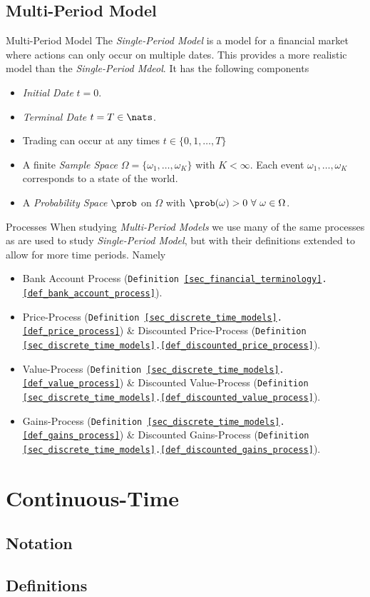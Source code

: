 \documentclass[11pt,a4paper]{article}
\begin{document}
\subsection{Multi-Period Model}

  \begin{definition}{Multi-Period Model}
    The \textit{Single-Period Model} is a model for a financial market where actions can only occur on multiple dates. This provides a more realistic model than the \textit{Single-Period Mdeol}. It has the following components
    \begin{itemize}
      \item \textit{Initial Date} $t=0$.
      \item \textit{Terminal Date} $t=T\in\nats$.
      \item Trading can occur at any times $t\in\{0,1,\dots,T\}$
      \item A finite \textit{Sample Space} $\Omega=\{\omega_1,\dots,\omega_K\}$ with $K<\infty$. Each event $\omega_1,\dots,\omega_K$ corresponds to a state of the world.
      \item A \textit{Probability Space} $\prob$ on $\Omega$ with $\prob(\omega)>0\ \forall\ \omega\in\Omega$.
    \end{itemize}
  \end{definition}

  \begin{remark}{Processes}
    When studying \textit{Multi-Period Models} we use many of the same processes as are used to study \textit{Single-Period Model}, but with their definitions extended to allow for more time periods. Namely
    \begin{itemize}
      \item Bank Account Process (\texttt{Definition \ref{sec_financial_terminology}.\ref{def_bank_account_process}}).
      \item Price-Process (\texttt{Definition \ref{sec_discrete_time_models}.\ref{def_price_process}}) \& Discounted Price-Process (\texttt{Definition \ref{sec_discrete_time_models}.\ref{def_discounted_price_process}}).
      \item Value-Process (\texttt{Definition \ref{sec_discrete_time_models}.\ref{def_value_process}}) \& Discounted Value-Process (\texttt{Definition \ref{sec_discrete_time_models}.\ref{def_discounted_value_process}}).
      \item Gains-Process (\texttt{Definition \ref{sec_discrete_time_models}.\ref{def_gains_process}}) \& Discounted Gains-Process (\texttt{Definition \ref{sec_discrete_time_models}.\ref{def_discounted_gains_process}}).
    \end{itemize}
  \end{remark}

\section{Continuous-Time}\label{sec_continuous_time_models}


\subsection{Notation}

\subsection{Definitions}
\end{document}
